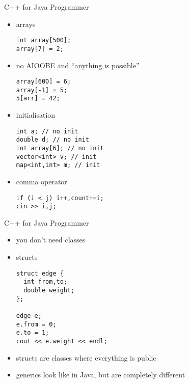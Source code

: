 \documentclass[12pt,t]{beamer}
\newcommand{\bi}{\begin{itemize}}
\newcommand{\ei}{\end{itemize}}
\begin{document}
\begin{frame}[fragile]{C++ for Java Programmer}
    \vspace{10pt}
    \bi
      \item arrays
	\begin{verbatim}
int array[500];
array[7] = 2;
	\end{verbatim}
      \item no AIOOBE and ``anything is possible''
	\begin{verbatim}
array[600] = 6;
array[-1] = 5;
5[arr] = 42;
	\end{verbatim}
	\item initialisation
	\begin{verbatim}
int a; // no init
double d; // no init
int array[6]; // no init
vector<int> v; // init
map<int,int> m; // init
	\end{verbatim}
      \item comma operator
	\begin{verbatim}
if (i < j) i++,count+=i;
cin >> i,j;
	\end{verbatim}
	\ei
\end{frame}


\begin{frame}[fragile]{C++ for Java Programmer}
    \vspace{10pt}
    \bi
      \item you don't need classes
      \item structs
      	\begin{verbatim}
struct edge {
  int from,to;
  double weight;
};

edge e;
e.from = 0;
e.to = 1;
cout << e.weight << endl;
	\end{verbatim}
	\item structs are classes where everything is public
	\item generics look like in Java, but are completely different
	
    \ei
\end{frame}




{
}
\end{document}

